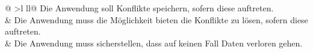\begin{longtable}[c]{@{}
>{}l ll@{}}
  {Die Anwendung soll Konflikte speichern, sofern diese auftreten.}\\
  \midrule
   &
  {Die Anwendung muss die Möglichkeit bieten die Konflikte zu lösen, sofern diese auftreten.}\\
  \midrule
   &
  {Die Anwendung muss sicherstellen, dass auf keinen Fall Daten verloren gehen.}\\
  \bottomrule {}
  \vspace{0.1cm}\\
  \noalign{\hspace{0.0525\textwidth}\grayRule}
  \caption{Funktionale Anforderungen}
  \label{tab:funcreq}\\
\end{longtable}
%
%
